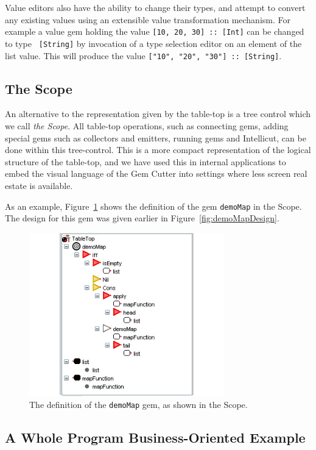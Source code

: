 \documentclass[preprint]{sigplanconf}
\begin{document}
Value editors also have the ability to change their types, and attempt
to convert any existing values using an extensible value
transformation mechanism. For example a value gem
holding the value {\tt [10, 20, 30] :: [Int]} can be changed to type {\tt
[String]} by invocation of a type selection editor on an element of
the list value. This will produce the value {\tt ["10", "20", "30"] ::
[String]}.

\subsection{The Scope}
\label{sec:scope}

An alternative to the representation given by the table-top is a
tree control which we call {\it the Scope}. All table-top operations,
such as connecting gems, adding special gems such as collectors and
emitters, running gems and Intellicut, can be done within this
tree-control. This is a more compact representation of the logical
structure of the table-top, and we have used this in internal
applications to embed the visual language of the Gem Cutter into
settings where less screen real estate is available.

As an example, Figure~\ref{fig:scope} shows the definition of the gem 
{\tt demoMap} in the Scope. The design for this gem was given earlier
in Figure~\ref{fig:demoMapDesign}.

\begin{figure}[htb]
  \centering
  \includegraphics[width=20pc]{scope.png}
  \caption{The definition of the {\tt demoMap} gem, as shown in the Scope.}
  \label{fig:scope}
\end{figure}

\subsection{A Whole Program Business-Oriented Example}
\label{sec:wholeProgram}
\end{document}
